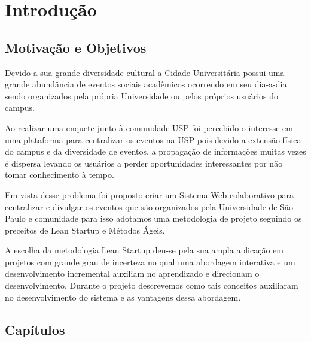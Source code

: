 \chapter{Introdução}
\label{cap:introducao}
\section{Motivação e Objetivos}

\par Devido a sua grande diversidade cultural a Cidade Universitária possui uma grande abundância de eventos sociais acadêmicos ocorrendo em seu dia-a-dia sendo organizados pela própria Universidade ou pelos próprios usuários do campus.

\par Ao realizar uma enquete junto à comunidade USP foi percebido o interesse em uma plataforma para centralizar os eventos na USP pois devido a extensão física do campus e da diversidade de eventos, a propagação de informações muitas vezes é dispersa levando os usuários a perder oportunidades interessantes por não tomar conhecimento à tempo.

\par Em vista desse problema foi proposto criar um Sistema Web colaborativo para centralizar e divulgar os eventos que são organizados pela Universidade de São Paulo e comunidade para isso adotamos uma metodologia de projeto seguindo os preceitos de Lean Startup e Métodos Ágeis.

\par A escolha da metodologia Lean Startup deu-se pela sua ampla aplicação em projetos com grande grau de incerteza no qual uma abordagem interativa e um desenvolvimento incremental auxiliam no aprendizado e direcionam o desenvolvimento. Durante o projeto descrevemos como tais conceitos auxiliaram no desenvolvimento do sistema e as vantagens dessa abordagem.

\section{Capítulos}
